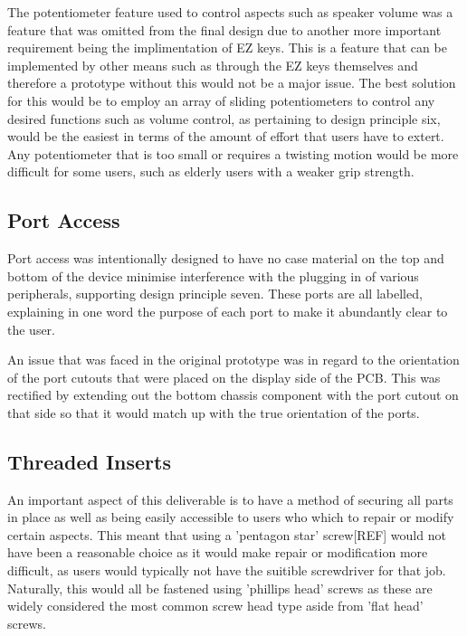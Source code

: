 The potentiometer feature used to control aspects such as speaker volume was a feature that was omitted from the final design due to another more important requirement being the implimentation of EZ keys.
This is a feature that can be implemented by other means such as through the EZ keys themselves and therefore a prototype without this would not be a major issue.
The best solution for this would be to employ an array of sliding potentiometers to control any desired functions such as volume control, as pertaining to design principle six, would be the easiest in terms of the amount of effort that users have to extert.
Any potentiometer that is too small or requires a twisting motion would be more difficult for some users, such as elderly users with a weaker grip strength.

\subsection{Port Access}

Port access was intentionally designed to have no case material on the top and bottom of the device minimise interference with the plugging in of various peripherals, supporting design principle seven.
These ports are all labelled, explaining in one word the purpose of each port to make it abundantly clear to the user.

An issue that was faced in the original prototype was in regard to the orientation of the port cutouts that were placed on the display side of the PCB.
This was rectified by extending out the bottom chassis component with the port cutout on that side so that it would match up with the true orientation of the ports. %

\subsection{Threaded Inserts}

An important aspect of this deliverable is to have a method of securing all parts in place as well as being easily accessible to users who which to repair or modify certain aspects.
This meant that using a 'pentagon star' screw[REF] would not have been a reasonable choice as it would make repair or modification more difficult, as users would typically not have the suitible screwdriver for that job.
Naturally, this would all be fastened using 'phillips head' screws as these are widely considered the most common screw head type aside from 'flat head' screws.

